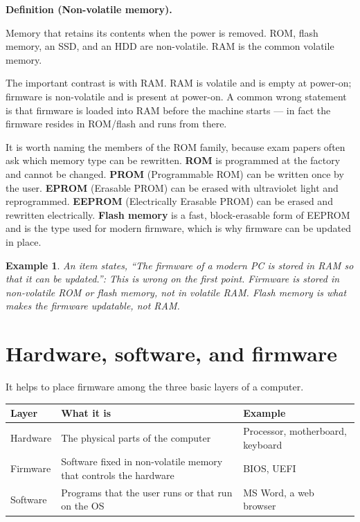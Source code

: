 \documentclass[11pt]{article}
\newtheorem{example}{Example}[section]
\newenvironment{definitionbox}[1]{%
  \par\noindent\textbf{Definition (#1).}\ \itshape
}{\par\vspace{0.3em}}
\begin{document}
\begin{definitionbox}{Non-volatile memory}
Memory that retains its contents when the power is removed. ROM, flash
memory, an SSD, and an HDD are non-volatile. RAM is the common volatile
memory.
\end{definitionbox}

The important contrast is with RAM. RAM is volatile and is empty at
power-on; firmware is non-volatile and is present at power-on. A common wrong
statement is that firmware is loaded into RAM before the machine starts --- in
fact the firmware resides in ROM/flash and runs from there.

It is worth naming the members of the ROM family, because exam papers often
ask which memory type can be rewritten. \textbf{ROM} is programmed at the
factory and cannot be changed. \textbf{PROM} (Programmable ROM) can be
written once by the user. \textbf{EPROM} (Erasable PROM) can be erased with
ultraviolet light and reprogrammed. \textbf{EEPROM} (Electrically Erasable
PROM) can be erased and rewritten electrically. \textbf{Flash memory} is a
fast, block-erasable form of EEPROM and is the type used for modern firmware,
which is why firmware can be updated in place.

\begin{example}
An item states, ``The firmware of a modern PC is stored in RAM so that it can
be updated.'': This is wrong on the first point. Firmware is stored in
non-volatile ROM or flash memory, not in volatile RAM. Flash memory is what
makes the firmware updatable, not RAM.
\end{example}

\section{Hardware, software, and firmware}
It helps to place firmware among the three basic layers of a computer.

\begin{center}
\begin{tabular}{p{}p{}p{}}
\toprule
\textbf{Layer} & \textbf{What it is} & \textbf{Example} \\
\midrule
Hardware & The physical parts of the computer & Processor, motherboard, keyboard \\
Firmware & Software fixed in non-volatile memory that controls the hardware & BIOS, UEFI \\
Software & Programs that the user runs or that run on the OS & MS Word, a web browser \\
\bottomrule
\end{tabular}
\end{center}
\end{document}
